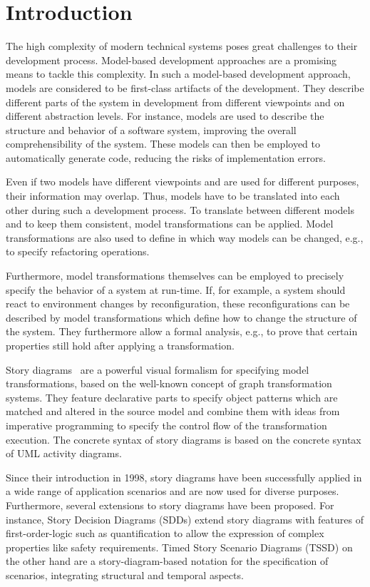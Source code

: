 \chapter{Introduction}
The high complexity of modern technical systems poses great challenges to their development process.
Model-based development approaches are a promising means to tackle this complexity.
In such a model-based development approach, models are considered to be first-class artifacts of the development.
They describe different parts of the system in development from different viewpoints and on different abstraction levels.
For instance, models are used to describe the structure and behavior of a software system, improving the overall comprehensibility of the system.
These models can then be employed to automatically generate code, reducing the risks of implementation errors.

Even if two models have different viewpoints and are used for different purposes, their information may overlap.
Thus, models have to be translated into each other during such a development process.
To translate between different models and to keep them consistent, model transformations can be applied.
Model transformations are also used to define in which way models can be changed, e.g., to specify refactoring operations.

Furthermore, model transformations themselves can be employed to precisely specify the behavior of a system at run-time.
If, for example, a system should react to environment changes by reconfiguration, these reconfigurations can be described by model transformations which define how to change the structure of the system.
They furthermore allow a formal analysis, e.g., to prove that certain properties still hold after applying a transformation.

Story diagrams~\cite{ZSW99,FNTZ00,Zun01} are a powerful visual formalism for specifying model transformations, based on the well-known concept of graph transformation systems.
They feature declarative parts to specify object patterns which are matched and altered in the source model and combine them with ideas from imperative programming to specify the control flow of the transformation execution.
The concrete syntax of story diagrams is based on the concrete syntax of UML activity diagrams.

Since their introduction in 1998, story diagrams have been successfully applied in a wide range of application scenarios and are now used for diverse purposes.
Furthermore, several extensions to story diagrams have been proposed.
For instance, Story Decision Diagrams (SDDs) \cite{GK06a} extend story diagrams with features of first-order-logic such as quantification to allow the expression of complex properties like safety requirements.
Timed Story Scenario Diagrams (TSSD) \cite{KG07a} on the other hand are a story-diagram-based notation for the specification of scenarios, integrating structural and temporal aspects.

